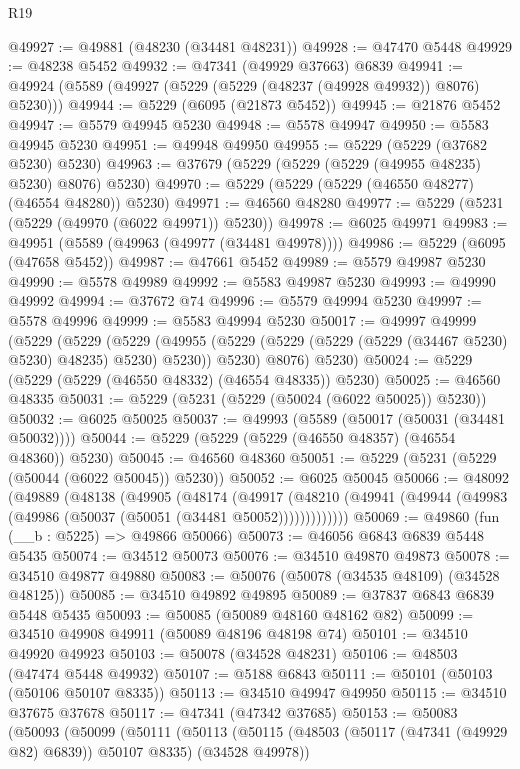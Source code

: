 \begin{lexlean}{R19}
\begin{coremodule}
@49927 := @49881 (@48230 (@34481 @48231))
@49928 := @47470 @5448
@49929 := @48238 @5452
@49932 := @47341 (@49929 @37663) @6839
@49941 := @49924 (@5589 (@49927 (@5229 (@5229 (@48237 (@49928 @49932)) @8076) @5230)))
@49944 := @5229 (@6095 (@21873 @5452))
@49945 := @21876 @5452
@49947 := @5579 @49945 @5230
@49948 := @5578 @49947
@49950 := @5583 @49945 @5230
@49951 := @49948 @49950
@49955 := @5229 (@5229 (@37682 @5230) @5230)
@49963 := @37679 (@5229 (@5229 (@5229 (@49955 @48235) @5230) @8076) @5230)
@49970 := @5229 (@5229 (@5229 (@46550 @48277) (@46554 @48280)) @5230)
@49971 := @46560 @48280
@49977 := @5229 (@5231 (@5229 (@49970 (@6022 @49971)) @5230))
@49978 := @6025 @49971
@49983 := @49951 (@5589 (@49963 (@49977 (@34481 @49978))))
@49986 := @5229 (@6095 (@47658 @5452))
@49987 := @47661 @5452
@49989 := @5579 @49987 @5230
@49990 := @5578 @49989
@49992 := @5583 @49987 @5230
@49993 := @49990 @49992
@49994 := @37672 @74
@49996 := @5579 @49994 @5230
@49997 := @5578 @49996
@49999 := @5583 @49994 @5230
@50017 := @49997
    @49999
    (@5229
      (@5229
        (@5229
          (@49955 (@5229 (@5229 (@5229 (@5229 (@34467 @5230) @5230) @48235) @5230) @5230))
          @5230)
        @8076)
      @5230)
@50024 := @5229 (@5229 (@5229 (@46550 @48332) (@46554 @48335)) @5230)
@50025 := @46560 @48335
@50031 := @5229 (@5231 (@5229 (@50024 (@6022 @50025)) @5230))
@50032 := @6025 @50025
@50037 := @49993 (@5589 (@50017 (@50031 (@34481 @50032))))
@50044 := @5229 (@5229 (@5229 (@46550 @48357) (@46554 @48360)) @5230)
@50045 := @46560 @48360
@50051 := @5229 (@5231 (@5229 (@50044 (@6022 @50045)) @5230))
@50052 := @6025 @50045
@50066 := @48092
    (@49889
      (@48138
        (@49905
          (@48174
            (@49917
              (@48210 (@49941 (@49944 (@49983 (@49986 (@50037 (@50051 (@34481 @50052)))))))))))))
@50069 := @49860 (fun (__b : @5225) => @49866 @50066)
@50073 := @46056 @6843 @6839 @5448 @5435
@50074 := @34512 @50073
@50076 := @34510 @49870 @49873
@50078 := @34510 @49877 @49880
@50083 := @50076 (@50078 (@34535 @48109) (@34528 @48125))
@50085 := @34510 @49892 @49895
@50089 := @37837 @6843 @6839 @5448 @5435
@50093 := @50085 (@50089 @48160 @48162 @82)
@50099 := @34510 @49908 @49911 (@50089 @48196 @48198 @74)
@50101 := @34510 @49920 @49923
@50103 := @50078 (@34528 @48231)
@50106 := @48503 (@47474 @5448 @49932)
@50107 := @5188 @6843
@50111 := @50101 (@50103 (@50106 @50107 @8335))
@50113 := @34510 @49947 @49950
@50115 := @34510 @37675 @37678
@50117 := @47341 (@47342 @37685)
@50153 := @50083
    (@50093
      (@50099
        (@50111
          (@50113
            (@50115 (@48503 (@50117 (@47341 (@49929 @82) @6839)) @50107 @8335) (@34528 @49978))

\end{coremodule}
\end{lexlean}
